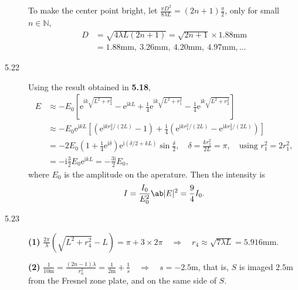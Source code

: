 \documentclass[11pt, twoside]{article}   	%
\theoremstyle{plain}
\theoremstyle{definition}
\begin{document}
\begin{description}
			To make the center point bright, let $\frac{\pi D^2}{8 \lambda L} = (2n + 1)
			\frac{\pi}{2}$, only for small $n \in \mathbb N$,
			\begin{equation}
				\begin{aligned}
					D &= \sqrt{4\lambda L (2n + 1)} = \sqrt{2n + 1} \times 1.88\mathrm{mm}\\
					  &= 1.88\mathrm{mm},~3.26\mathrm{mm},~4.20\mathrm{mm},~4.97\mathrm{mm},...
				\end{aligned}
			\end{equation}
		\item[5.22] Using the result obtained in \textbf{5.18},
			\begin{equation}
				\begin{aligned}
					E &\approx -E_0 \left[ \mathrm e^{\mathrm{i}k\sqrt{L^2 + r_2^2}} - \mathrm e^{
					\mathrm{i}kL} + \frac{1}{4} \mathrm e^{\mathrm{i}k\sqrt{L^2 + r_1^2}}
					- \frac{1}{4} \mathrm e^{\mathrm{i}k\sqrt{L^2 + r_2^2}} \right]\\
					  &\approx -E_0 \mathrm e^{\mathrm{i}kL} \left[ \left( \mathrm e^{\mathrm{i}k
					  r_2^2/(2L)} - 1 \right) + \frac{1}{4} \left( \mathrm e^{\mathrm{i}k r_1^2/(2L)}
					  - \mathrm e^{\mathrm{i}k r_2^2/(2L)} \right) \right]\\
					  &= -2 E_0 \left( 1 + \frac{1}{4} \mathrm e^{\mathrm{i}\delta} \right)
					  \mathrm e^{\mathrm{i}(\delta / 2 + kL)} \sin \frac{\delta}{2}, \quad \delta =
					  \frac{k r_2^2}{2L} = \pi, \quad \text{using $r_1^2 = 2 r_1^2$},\\
					  &= -\mathrm{i}\frac{3}{2} E_0 \mathrm e^{\mathrm{i}kL}
					  = -\frac{3\mathrm{i}}{2}E_0,
				\end{aligned}
			\end{equation}
			where $E_0$ is the amplitude on the aperature. Then the intensity is
			\begin{equation}
				I = \frac{I_0}{E_0^2}\ab|E|^2 = \frac{9}{4} I_0.
			\end{equation}
		\item[5.23] \textbf{(1)} $\frac{2\pi}{\lambda} \left( \sqrt{L^2 + r_4^2} - L \right) = \pi +
			3 \times 2\pi \quad \Rightarrow \quad r_4 \approx \sqrt{7\lambda L} = 5.916\mathrm{mm}$.

			\textbf{(2)} $\frac{1}{10\mathrm{m}} = \frac{(2n-1)\lambda}{r_n^2} = \frac{1}{2\mathrm{m}
			} + \frac{1}{s} \quad \Rightarrow \quad s = -2.5\mathrm{m}$, that is, $S$ is imaged
			$2.5\mathrm{m}$ from the Fresnel zone plate, and on the same side of $S$.
	\end{description}
\end{document}
